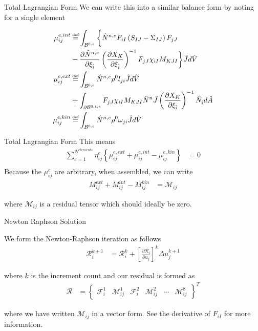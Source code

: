 \documentclass[11pt]{beamer}
\newcommand\defeq{\mathrel{\stackrel{\makebox[0pt]{\mbox{\normalfont\tiny def}}}{=}}}
\begin{document}
\begin{frame}{Total Lagrangian Form}
We can write this into a similar balance form by noting for a single element

\begin{align*}
\mu_{ij}^{e,int} &\defeq \int_{\mathcal{B}^{0,e}}  \bigg\{\hat{N}^{n,e}F_{iI} \left(S_{IJ}-\Sigma_{IJ}\right) F_{jJ}\\
& - \frac{\partial \hat{N}^{n,e}}{\partial \xi_{\hat{i}}} \left(\frac{\partial X_{K}}{\partial \xi_{\hat{i}}}\right)^{-1} F_{jJ} \chi_{iI}  M_{KJI} \bigg\} \hat{J} d\hat{V}\\
\mu_{ij}^{e,ext} &\defeq \int_{\mathcal{B}^{0,e}}  \hat{N}^{n,e} \rho^0 l_{ji} \hat{J}d\hat{V}\\
& + \int_{\partial \mathcal{B}^{0,t,e}} F_{jJ} \chi_{iI}  M_{KJI} \hat{N}^n \hat{J} \left(\frac{\partial X_{K}}{\partial \xi_{\hat{i}}}\right)^{-1} \hat{N}_{\hat{i}} d\hat{A}\\
\mu_{ij}^{e,kin} &\defeq \int_{\mathcal{B}^{0,e}}  \hat{N}^{n,e} \rho^0 \omega_{ji} \hat{J}d\hat{V}\\
\end{align*}
\end{frame}

\begin{frame}{Total Lagrangian Form}
This means
\begin{align*}
\sum_{e=1}^{N^{elements}} \eta_{ij}^{e} \left\{ \mu_{ij}^{e,ext} + \mu_{ij}^{e,int} - \mu_{ij}^{e,kin}\right\} &= 0\\
\end{align*}
Because the $\mu_{ij}^e$ are arbitrary, when assembled, we can write
\begin{align*}
M_{ij}^{ext} + M_{ij}^{int} - M_{ij}^{kin} &= \mathcal{M}_{ij}
\end{align*}

where $\mathcal{M}_{ij}$ is a residual tensor which should ideally be zero.

\end{frame}

\begin{frame}{Newton Raphson Solution}

We form the Newton-Raphson iteration as follows
\begin{align*}
\mathcal{R}^{k+1}_{i} &= \mathcal{R}^k_i + \left[\frac{\partial \mathcal{R}_i}{\partial u_j} \right]^k\Delta u_j^{k+1}
\end{align*}

where $k$ is the increment count and our residual is formed as
\begin{align*}
\mathcal{R} &= \left\{ \begin{array}{cccccc}
\mathcal{F}_i^1 & \mathcal{M}_{ij}^1 & \mathcal{F}_i^2 & \mathcal{M}_{ij}^2 & \cdots & \mathcal{M}_{ij}^8
\end{array}\right\}^T
\end{align*}

where we have written $\mathcal{M}_{ij}$ in a vector form. See the derivative of $F_{iI}$ for more information.

\end{frame}
\end{document}
